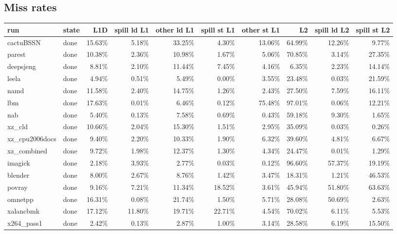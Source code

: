\documentclass[10pt,a4paper,landscape]{article}
\begin{document}
\subsection*{Miss rates}
{\footnotesize
\begin{longtable}{llrrrrrrrr}
\toprule
run & state & L1D & spill ld L1 & other ld L1 & spill st L1 & other st L1 & L2 & spill ld L2 & spill st L2 \\
\midrule
\endhead
\bottomrule
\endfoot
cactuBSSN & done & 15.63\% & 5.18\% & 33.25\% & 4.30\% & 13.06\% & 64.99\% & 12.26\% & 9.77\% \\
parest & done & 10.38\% & 2.36\% & 10.98\% & 1.67\% & 5.06\% & 70.85\% & 3.14\% & 27.35\% \\
deepsjeng & done & 8.81\% & 2.10\% & 11.44\% & 7.45\% & 4.16\% & 6.35\% & 2.23\% & 14.14\% \\
leela & done & 4.94\% & 0.51\% & 5.49\% & 0.00\% & 3.55\% & 23.48\% & 0.03\% & 21.59\% \\
namd & done & 11.58\% & 2.40\% & 14.75\% & 1.26\% & 2.43\% & 27.50\% & 7.59\% & 16.11\% \\
lbm & done & 17.63\% & 0.01\% & 6.46\% & 0.12\% & 75.48\% & 97.01\% & 0.06\% & 12.21\% \\
nab & done & 5.40\% & 0.13\% & 7.58\% & 0.69\% & 0.43\% & 59.18\% & 9.30\% & 1.65\% \\
xz\_cld & done & 10.66\% & 2.04\% & 15.30\% & 1.51\% & 2.95\% & 35.09\% & 0.03\% & 0.26\% \\
xz\_cpu2006docs & done & 9.40\% & 2.20\% & 10.33\% & 1.90\% & 6.32\% & 39.60\% & 4.81\% & 6.67\% \\
xz\_combined & done & 9.72\% & 1.98\% & 12.37\% & 1.30\% & 4.34\% & 24.47\% & 0.01\% & 1.29\% \\
imagick & done & 2.18\% & 3.93\% & 2.77\% & 0.03\% & 0.12\% & 96.60\% & 57.37\% & 19.19\% \\
blender & done & 8.00\% & 2.67\% & 8.76\% & 1.42\% & 3.47\% & 18.31\% & 1.21\% & 46.53\% \\
povray & done & 9.16\% & 7.21\% & 11.34\% & 18.52\% & 3.61\% & 45.94\% & 51.80\% & 63.63\% \\
omnetpp & done & 16.31\% & 0.08\% & 21.74\% & 1.50\% & 5.71\% & 28.08\% & 50.69\% & 2.63\% \\
xalancbmk & done & 17.12\% & 11.80\% & 19.71\% & 22.71\% & 4.54\% & 70.02\% & 6.11\% & 5.53\% \\
x264\_pass1 & done & 2.42\% & 0.13\% & 2.87\% & 1.00\% & 3.14\% & 28.58\% & 6.19\% & 15.50\% \\

\end{longtable}}
\end{document}

